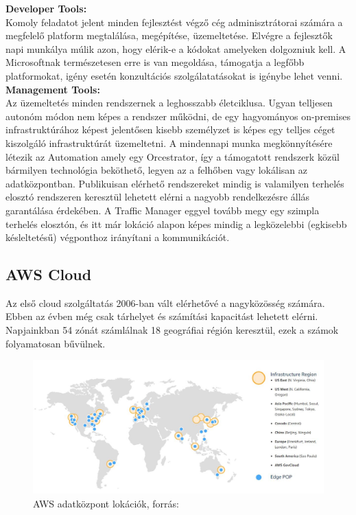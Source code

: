 \documentclass[12pt,oneside,justify,table]{book}
\begin{document}
\noindent \textbf{Developer Tools:}\\
Komoly feladatot jelent minden fejlesztést végző cég adminisztrátorai számára a megfelelő platform megtalálása, megépítése, üzemeltetése. Elvégre a fejlesztők napi munkálya múlik azon, hogy elérik-e a kódokat amelyeken dolgozniuk kell. A Microsoftnak természetesen erre is van megoldása, támogatja a legfőbb platformokat, igény esetén konzultációs szolgálatatásokat is igénybe lehet venni. \\

\noindent \textbf{Management Tools:}\\
Az üzemeltetés minden rendszernek a leghosszabb életciklusa. Ugyan telljesen autonóm módon nem képes a rendszer működni, de egy hagyományos on-premises infrastruktúrához képest jelentősen kisebb személyzet is képes egy telljes céget kiszolgáló infrastruktúrát üzemeltetni. A mindennapi munka megkönnyítésére létezik az Automation amely egy Orcestrator, így a támogatott rendszerk közül bármilyen technológia beköthető, legyen az a felhőben vagy lokálisan az adatközpontban. Publikuisan elérhető rendszereket mindig is valamilyen terhelés elosztó rendszeren keresztül lehetett elérni a nagyobb rendelkezésre állás garantálása érdekében. A Traffic Manager eggyel tovább megy egy szimpla terhelés elosztón, és itt már lokáció alapon képes mindig a legközelebbi (egkisebb késleltetésű) végponthoz irányítani a kommunikációt.  \\
\newpage
\subsection{AWS Cloud}
Az első cloud szolgáltatás 2006-ban vált elérhetővé a nagyközösség számára. Ebben az évben még csak tárhelyet és számítási kapacitást lehetett elérni. Napjainkban 54 zónát számlálnak 18 geográfiai régión keresztül, ezek a számok folyamatosan bűvülnek.
\begin{figure}[h]
\centering
\includegraphics[width=1\textwidth]{aws_locations.jpg}
\caption{AWS adatközpont lokációk, forrás: \cite{AWS_Regions}}
\label{fig:AWSRegions}
\end{figure}
\end{document}
